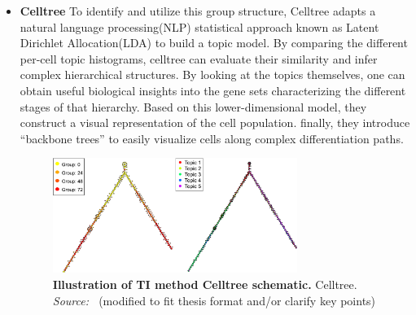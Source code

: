\begin{itemize}
    \item \textbf{Celltree}
    To identify and utilize this group structure, Celltree\citep{duverle2016celltree} adapts a natural language processing(NLP) statistical approach known as Latent Dirichlet Allocation(LDA) to build a topic model. By comparing the different per-cell topic histograms, celltree can evaluate their similarity and infer complex hierarchical structures. By looking at the topics themselves, one can obtain useful biological insights into the gene sets characterizing the different stages of that hierarchy. Based on this lower-dimensional model, they construct a visual representation of the cell population. finally, they introduce “backbone trees” to easily visualize cells along complex differentiation paths.
    \begin{figure}[ht!]
    	\centering
    	\includegraphics[width=0.75\textwidth]{TI_Alg_celltree/fig}
    	\vspace{0.1cm}
    	\caption[Illustration of TI method Celltree schematic.]{\textbf{Illustration of TI method Celltree schematic.} Celltree. \emph{Source: ~\cite{duverle2016celltree}}(modified to fit thesis format and/or clarify key points)
    	}
    	\label{fig:TI_Alg_celltree}
    \end{figure}
    

\end{itemize}
